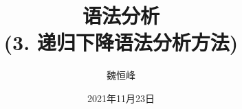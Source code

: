 \documentclass[]{beamer}
\title[语法分析]{语法分析 \\ (3. 递归下降语法分析方法)}
\author[魏恒峰]{\large 魏恒峰}
\institute{hfwei@nju.edu.cn}
\date{2021年11月23日}
\begin{document}
\maketitle




\thankyou{}

\end{document}
